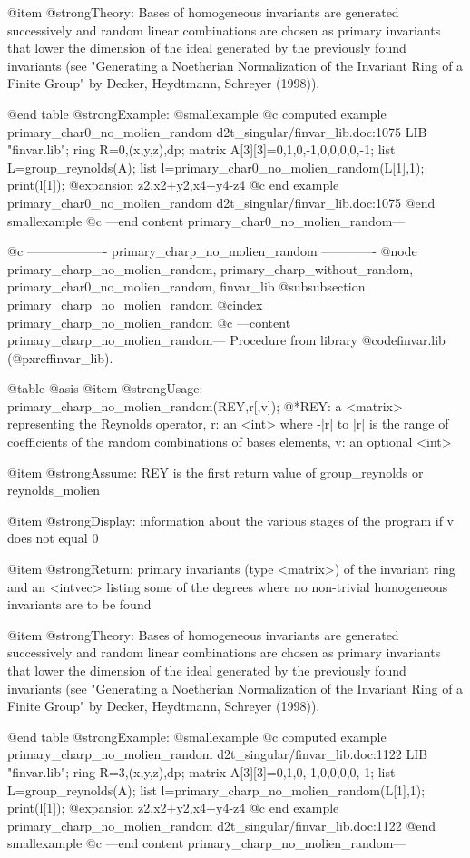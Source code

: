 @item @strong{Theory:}
Bases of homogeneous invariants are generated successively and random
linear combinations are chosen as primary invariants that lower the
dimension of the ideal generated by the previously found invariants
(see "Generating a Noetherian Normalization of the Invariant Ring of
a Finite Group" by Decker, Heydtmann, Schreyer (1998)).

@end table
@strong{Example:}
@smallexample
@c computed example primary_char0_no_molien_random d2t_singular/finvar_lib.doc:1075 
LIB "finvar.lib";
ring R=0,(x,y,z),dp;
matrix A[3][3]=0,1,0,-1,0,0,0,0,-1;
list L=group_reynolds(A);
list l=primary_char0_no_molien_random(L[1],1);
print(l[1]);
@expansion{} z2,x2+y2,x4+y4-z4
@c end example primary_char0_no_molien_random d2t_singular/finvar_lib.doc:1075
@end smallexample
@c ---end content primary_char0_no_molien_random---

@c ------------------- primary_charp_no_molien_random -------------
@node primary_charp_no_molien_random, primary_charp_without_random, primary_char0_no_molien_random, finvar_lib
@subsubsection primary_charp_no_molien_random
@cindex primary_charp_no_molien_random
@c ---content primary_charp_no_molien_random---
Procedure from library @code{finvar.lib} (@pxref{finvar_lib}).

@table @asis
@item @strong{Usage:}
primary_charp_no_molien_random(REY,r[,v]);
@*REY: a <matrix> representing the Reynolds operator, r: an <int> where
-|r| to |r| is the range of coefficients of the random combinations of
bases elements, v: an optional <int>

@item @strong{Assume:}
REY is the first return value of group_reynolds or reynolds_molien

@item @strong{Display:}
information about the various stages of the program if v does not
equal 0

@item @strong{Return:}
primary invariants (type <matrix>) of the invariant ring and an
<intvec> listing some of the degrees where no non-trivial homogeneous
invariants are to be found

@item @strong{Theory:}
Bases of homogeneous invariants are generated successively and random
linear combinations are chosen as primary invariants that lower the
dimension of the ideal generated by the previously found invariants
(see "Generating a Noetherian Normalization of the Invariant Ring of
a Finite Group" by Decker, Heydtmann, Schreyer (1998)).

@end table
@strong{Example:}
@smallexample
@c computed example primary_charp_no_molien_random d2t_singular/finvar_lib.doc:1122 
LIB "finvar.lib";
ring R=3,(x,y,z),dp;
matrix A[3][3]=0,1,0,-1,0,0,0,0,-1;
list L=group_reynolds(A);
list l=primary_charp_no_molien_random(L[1],1);
print(l[1]);
@expansion{} z2,x2+y2,x4+y4-z4
@c end example primary_charp_no_molien_random d2t_singular/finvar_lib.doc:1122
@end smallexample
@c ---end content primary_charp_no_molien_random---

